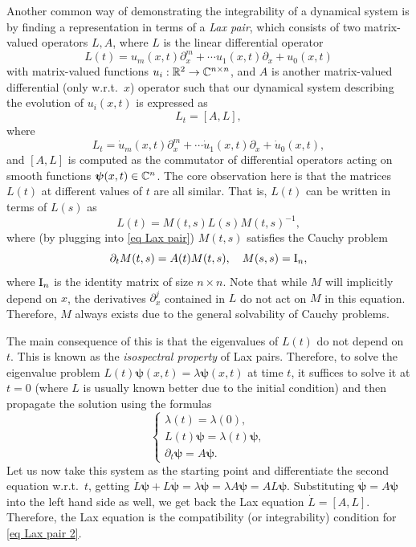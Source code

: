 \begin{example}\label{ex Lax pairs}
    Another common way of demonstrating the integrability of a dynamical system is by finding a representation in terms of a \emph{Lax pair}, which consists of two matrix-valued operators $L,A$, where $L$ is the linear differential operator
    \[L(t)=u_m(x,t)\partial_x^m+\cdots u_1(x,t)\partial_x+u_0(x,t)\]
    with matrix-valued functions $u_i:\mathbb{R}^2\to \mathbb{C}^{n\times n}$, and $A$ is another matrix-valued differential (only w.r.t.\ $x$) operator such that our dynamical system describing the evolution of $u_i(x,t)$ is expressed as 
    \[L_t=[A,L],\label{eq Lax pair}\]
    where 
    \[L_t=\dot u_m(x,t)\partial_x^m+\cdots \dot u_1(x,t)\partial_x+\dot u_0(x,t),\]
    and $[A,L]$ is computed as the commutator of differential operators acting on smooth functions $\boldsymbol{\mathrm{\psi}}(x,t)\in\mathbb{C}^n$. The core observation here is that the matrices $L(t)$ at different values of $t$ are all similar. That is, $L(t)$ can be written in terms of $L(s)$ as 
    \[L(t)=M(t,s)L(s)M(t,s)^{-1},\]
    where (by plugging into \eqref{eq Lax pair}) $M(t,s)$ satisfies the Cauchy problem 
    \[\partial_t M(t,s)=A(t)M(t,s),\quad M(s,s)=\mathrm{I}_n,\]
    where $\mathrm{I}_n$ is the identity matrix of size $n\times n$.
    Note that while $M$ will implicitly depend on $x$, the derivatives $\partial_x^j$ contained in $L$ do not act on $M$ in this equation. Therefore, $M$ always exists due to the general solvability of Cauchy problems.

    The main consequence of this is that the eigenvalues of $L(t)$ do not depend on $t$. This is known as the \emph{isospectral property} of Lax pairs. Therefore, to solve the eigenvalue problem $L(t)\bm{\psi}(x,t)=\lambda\bm{\psi}(x,t)$ at time $t$, it suffices to solve it at $t=0$ (where $L$ is usually known better due to the initial condition) and then propagate the solution using the formulas
    \[\begin{cases}
        \lambda(t)=\lambda(0),\\
        L(t)\bm{\psi}=\lambda(t)\bm{\psi},\\
        \partial_t\bm{\psi}=A\bm{\psi}.
    \end{cases}\label{eq Lax pair 2}\]
    Let us now take this system as the starting point and differentiate the second equation w.r.t.\ $t$, getting $\dot L\bm{\psi}+L\dot{\bm{\psi}}=\lambda\dot{\bm{\psi}}=\lambda A\bm{\psi}=A L\bm{\psi}$. Substituting $\dot{\bm{\psi}}=A\bm{\psi}$ into the left hand side as well, we get back the Lax equation $\dot L=[A,L]$. Therefore, the Lax equation is the compatibility (or integrability) condition for \eqref{eq Lax pair 2}.


\end{example}
